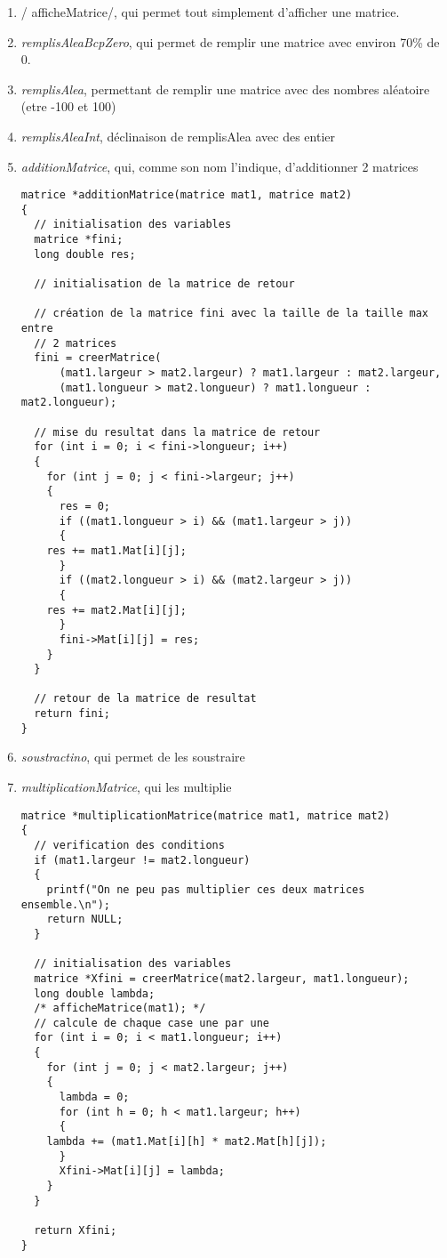 \documentclass[letter]{article}
\begin{document}
\begin{enumerate}
\begin{enumerate}
\item / afficheMatrice/, qui permet tout simplement d'afficher une matrice.

\item \emph{remplisAleaBcpZero}, qui permet de remplir une matrice avec environ 70\% de 0.

\item \emph{remplisAlea}, permettant de remplir une matrice avec des nombres aléatoire (etre -100 et 100)

\item \emph{remplisAleaInt}, déclinaison de remplisAlea avec des entier

\item \emph{additionMatrice}, qui, comme son nom l'indique, d'additionner 2 matrices
\begin{verbatim}
matrice *additionMatrice(matrice mat1, matrice mat2)
{
  // initialisation des variables
  matrice *fini;
  long double res;

  // initialisation de la matrice de retour

  // création de la matrice fini avec la taille de la taille max entre
  // 2 matrices
  fini = creerMatrice(
      (mat1.largeur > mat2.largeur) ? mat1.largeur : mat2.largeur,
      (mat1.longueur > mat2.longueur) ? mat1.longueur : mat2.longueur);

  // mise du resultat dans la matrice de retour
  for (int i = 0; i < fini->longueur; i++)
  {
    for (int j = 0; j < fini->largeur; j++)
    {
      res = 0;
      if ((mat1.longueur > i) && (mat1.largeur > j))
      {
	res += mat1.Mat[i][j];
      }
      if ((mat2.longueur > i) && (mat2.largeur > j))
      {
	res += mat2.Mat[i][j];
      }
      fini->Mat[i][j] = res;
    }
  }

  // retour de la matrice de resultat
  return fini;
}
\end{verbatim}

\item \emph{soustractino}, qui permet de les soustraire

\item \emph{multiplicationMatrice}, qui les multiplie
\begin{verbatim}
matrice *multiplicationMatrice(matrice mat1, matrice mat2)
{
  // verification des conditions
  if (mat1.largeur != mat2.longueur)
  {
    printf("On ne peu pas multiplier ces deux matrices ensemble.\n");
    return NULL;
  }

  // initialisation des variables
  matrice *Xfini = creerMatrice(mat2.largeur, mat1.longueur);
  long double lambda;
  /* afficheMatrice(mat1); */
  // calcule de chaque case une par une
  for (int i = 0; i < mat1.longueur; i++)
  {
    for (int j = 0; j < mat2.largeur; j++)
    {
      lambda = 0;
      for (int h = 0; h < mat1.largeur; h++)
      {
	lambda += (mat1.Mat[i][h] * mat2.Mat[h][j]);
      }
      Xfini->Mat[i][j] = lambda;
    }
  }

  return Xfini;
}
\end{verbatim}
\end{enumerate}
\end{enumerate}
\end{document}
